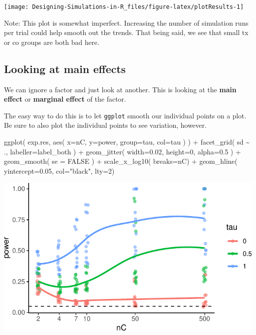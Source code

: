 \documentclass[
]{book}
\newenvironment{Shaded}{\begin{snugshade}}{\end{snugshade}}
\newcommand{\AttributeTok}[1]{\textcolor[rgb]{0.77,0.63,0.00}{#1}}
\newcommand{\ConstantTok}[1]{\textcolor[rgb]{0.00,0.00,0.00}{#1}}
\newcommand{\DecValTok}[1]{\textcolor[rgb]{0.00,0.00,0.81}{#1}}
\newcommand{\FloatTok}[1]{\textcolor[rgb]{0.00,0.00,0.81}{#1}}
\newcommand{\FunctionTok}[1]{\textcolor[rgb]{0.00,0.00,0.00}{#1}}
\newcommand{\NormalTok}[1]{#1}
\newcommand{\SpecialCharTok}[1]{\textcolor[rgb]{0.00,0.00,0.00}{#1}}
\newcommand{\StringTok}[1]{\textcolor[rgb]{0.31,0.60,0.02}{#1}}
\begin{document}
\begin{center}\texttt{[image: Designing-Simulations-in-R\_files/figure-latex/plotResults-1]} \end{center}

Note: This plot is somewhat imperfect. Increasing the number of simulation
runs per trial could help smooth out the trends. That being said, we see that
small tx or co groups are both bad here.

\hypertarget{looking-at-main-effects}{%
\subsection{Looking at main effects}\label{looking-at-main-effects}}

We can ignore a factor and just look at another. This is looking at the
\textbf{main effect} or \textbf{marginal effect} of the factor.

The easy way to do this is to let \texttt{ggplot} smooth our individual points on a
plot. Be sure to also plot the individual points to see variation, however.

\begin{Shaded}
\begin{Highlighting}[]
\FunctionTok{ggplot}\NormalTok{( exp.res, }\FunctionTok{aes}\NormalTok{( }\AttributeTok{x=}\NormalTok{nC, }\AttributeTok{y=}\NormalTok{power, }\AttributeTok{group=}\NormalTok{tau, }\AttributeTok{col=}\NormalTok{tau ) ) }\SpecialCharTok{+}
  \FunctionTok{facet\_grid}\NormalTok{( sd }\SpecialCharTok{\textasciitilde{}}\NormalTok{ ., }\AttributeTok{labeller=}\NormalTok{label\_both ) }\SpecialCharTok{+}
  \FunctionTok{geom\_jitter}\NormalTok{( }\AttributeTok{width=}\FloatTok{0.02}\NormalTok{, }\AttributeTok{height=}\DecValTok{0}\NormalTok{, }\AttributeTok{alpha=}\FloatTok{0.5}\NormalTok{ ) }\SpecialCharTok{+}
  \FunctionTok{geom\_smooth}\NormalTok{( }\AttributeTok{se =} \ConstantTok{FALSE}\NormalTok{ ) }\SpecialCharTok{+}
  \FunctionTok{scale\_x\_log10}\NormalTok{( }\AttributeTok{breaks=}\NormalTok{nC) }\SpecialCharTok{+}
  \FunctionTok{geom\_hline}\NormalTok{( }\AttributeTok{yintercept=}\FloatTok{0.05}\NormalTok{, }\AttributeTok{col=}\StringTok{"black"}\NormalTok{, }\AttributeTok{lty=}\DecValTok{2}\NormalTok{)}
\end{Highlighting}
\end{Shaded}

\begin{center}\includegraphics[width=0.75\linewidth]{Designing-Simulations-in-R_files/figure-latex/plotPool-1} \end{center}
\end{document}
